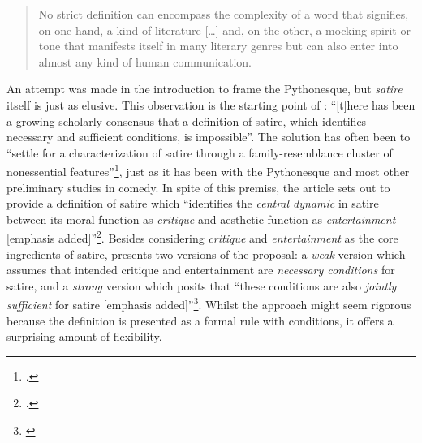 \documentclass[
,a4paper
,DIV=12
,12pt
,abstract
,bibliography=totoc
]{scrartcl}
\begin{document}
\begin{quote}
  \label{quote-satire-elusive}
  No strict definition can encompass the complexity of a word that signifies, on one hand, a kind of literature […] and, on the other, a mocking spirit or tone that manifests itself in many literary genres but can also enter into almost any kind of human communication.
\end{quote}
An attempt was made in the introduction to frame the Pythonesque, but \emph{satire} itself is just as elusive.  This observation is the starting point of \textcite[319]{declercq2018}: \enquote{[t]here has been a growing scholarly consensus that a definition of satire, which identifies necessary and sufficient conditions, is impossible}.  The solution has often been to \enquote{settle for a characterization of satire through a family-resemblance cluster of nonessential features}\footnote{\Cite[319]{declercq2018}.}, just as it has been with the Pythonesque and most other preliminary studies in comedy.  In spite of this premiss, the article sets out to provide a definition of satire which \enquote{identifies the \emph{central dynamic} in satire between its moral function as \emph{critique} and aesthetic function as \emph{entertainment} [emphasis added]}\footnote{\Cite[319]{declercq2018}.}.  Besides considering \emph{critique} and \emph{entertainment} as the core ingredients of satire, \textcite{declercq2018} presents two versions of the proposal: a \emph{weak} version which assumes that intended critique and entertainment are \emph{necessary conditions} for satire, and a \emph{strong} version which posits that \enquote{these conditions are also \emph{jointly sufficient} for satire [emphasis added]}\footnote{\Cite[319]{declercq2018}}.  Whilst the approach might seem rigorous because the definition is presented as a formal rule with conditions, it offers a surprising amount of flexibility.
\end{document}
